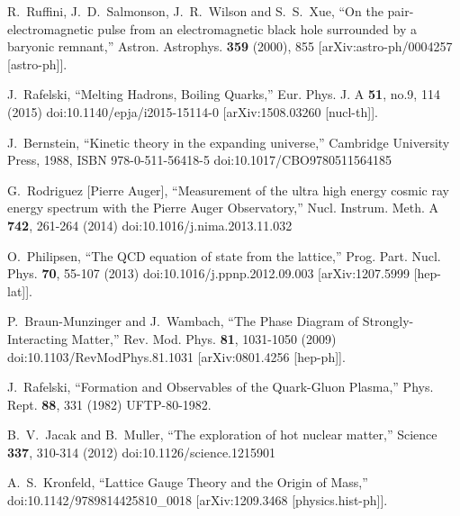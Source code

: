 \begin{thebibliography}{99}
R.~Ruffini, J.~D.~Salmonson, J.~R.~Wilson and S.~S.~Xue,
``On the pair-electromagnetic pulse from an electromagnetic black hole surrounded by a baryonic
remnant,''
Astron. Astrophys. \textbf{359} (2000), 855
[arXiv:astro-ph/0004257 [astro-ph]].

J.~Rafelski,
``Melting Hadrons, Boiling Quarks,''
Eur. Phys. J. A \textbf{51}, no.9, 114 (2015)
doi:10.1140/epja/i2015-15114-0
[arXiv:1508.03260 [nucl-th]].

J.~Bernstein,
``Kinetic theory in the expanding universe,''
Cambridge University Press, 1988,
ISBN 978-0-511-56418-5
doi:10.1017/CBO9780511564185

G.~Rodriguez [Pierre Auger],
``Measurement of the ultra high energy cosmic ray energy spectrum with the Pierre Auger Observatory,''
Nucl. Instrum. Meth. A \textbf{742}, 261-264 (2014)
doi:10.1016/j.nima.2013.11.032

O.~Philipsen,
``The QCD equation of state from the lattice,''
Prog. Part. Nucl. Phys. \textbf{70}, 55-107 (2013)
doi:10.1016/j.ppnp.2012.09.003
[arXiv:1207.5999 [hep-lat]].

P.~Braun-Munzinger and J.~Wambach,
``The Phase Diagram of Strongly-Interacting Matter,''
Rev. Mod. Phys. \textbf{81}, 1031-1050 (2009)
doi:10.1103/RevModPhys.81.1031
[arXiv:0801.4256 [hep-ph]].

J.~Rafelski,
``Formation and Observables of the Quark-Gluon Plasma,''
Phys. Rept. \textbf{88}, 331 (1982)
UFTP-80-1982.

B.~V.~Jacak and B.~Muller,
``The exploration of hot nuclear matter,''
Science \textbf{337}, 310-314 (2012)
doi:10.1126/science.1215901

A.~S.~Kronfeld,
``Lattice Gauge Theory and the Origin of Mass,''
doi:10.1142/9789814425810\_0018
[arXiv:1209.3468 [physics.hist-ph]].


\end{thebibliography}
